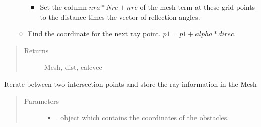 \documentclass[letterpaper,10pt,english]{sphinxmanual}
\begin{document}
\begin{fulllineitems}
\begin{fulllineitems}
\begin{itemize}
\begin{itemize}
\begin{itemize}
\item {} 
Set the column \(nra*Nre+nre\) of the mesh term at         these grid points to the distance times the vector of         reflection angles.

\end{itemize}

\begin{sphinxVerbatim}[commandchars=\\\{\}]
\PYG{p}{[}\PYG{p}{[}\PYG{p}{]}\PYG{p}{[}\PYG{p}{]}\PYG{p}{[}\PYG{p}{]}\PYG{p}{[}\PYG{p}{]}\PYG{p}{[}\PYG{p}{]}\PYG{p}{[}\PYG{p}{]}\PYG{p}{]}\PYG{p}{[}\PYG{p}{]}
\end{sphinxVerbatim}

\item {} 
Find the co\sphinxhyphen{}ordinate for the next ray point.       \(p1=p1+alpha*direc\).

\end{itemize}

\end{itemize}
\begin{quote}\begin{description}
\item[{Returns}] \leavevmode
Mesh, dist, calcvec

\end{description}\end{quote}

\end{fulllineitems}


\begin{fulllineitems}
\label{\detokenize{index:Rays.Ray.mesh_singleray}}
Iterate between two intersection points and store the ray     information in the Mesh
\begin{quote}\begin{description}
\item[{Parameters}] \leavevmode\begin{itemize}
\item {} 
 \textendash{} {\hyperref[\detokenize{index:module-Room}]{}}.  object which     contains the co\sphinxhyphen{}ordinates of the obstacles.


\end{itemize}
\end{description}
\end{quote}
\end{fulllineitems}
\end{fulllineitems}
\end{document}
